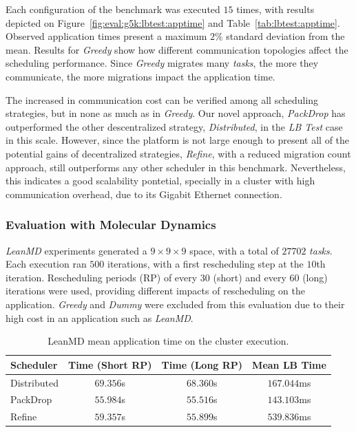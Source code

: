 
Each configuration of the benchmark was executed $15$ times, with results depicted on Figure~\ref{fig:eval:g5k:lbtest:apptime} and Table~\ref{tab:lbtest:apptime}.
Observed application times present a maximum $2\%$ standard deviation from the mean. 
Results for \textit{Greedy} show how different communication topologies affect the scheduling performance.
Since \textit{Greedy} migrates many \textit{tasks}, the more they communicate, the more migrations impact the application time.

The increased in communication cost can be verified among all scheduling strategies, but in none as much as in \textit{Greedy}.
Our novel approach, \textit{PackDrop} has outperformed the other descentralized strategy, \textit{Distributed}, in the \textit{LB Test} case in this scale.
However, since the platform is not large enough to present all of the potential gains of decentralized strategies, \textit{Refine}, with a reduced migration count approach, still outperforms any other scheduler in this benchmark.
Nevertheless, this indicates a good scalability pontetial, specially in a cluster with high communication overhead, due to its Gigabit Ethernet connection.

\subsubsection{Evaluation with Molecular Dynamics} \label{sec:cluster:md}

\textit{LeanMD} experiments generated a $9\times9\times9$ space, with a total of $27702$ \textit{tasks}.
Each execution ran $500$ iterations, with a first rescheduling step at the $10$th iteration. 
Rescheduling periods (RP) of every $30$ (short) and every $60$ (long) iterations were used, providing different impacts of rescheduling on the application.
\textit{Greedy} and \textit{Dummy} were excluded from this evaluation due to their high cost in an application such as \textit{LeanMD}. 

\begin{table}[!ht]
	\centering
	\caption{LeanMD mean application time on the cluster execution.}	
	\begin{tabular}{l|c c c}
	Scheduler & Time (Short RP) & Time (Long RP) & Mean LB Time \\ \hline
	Distributed & $69.356$s & $68.360$s & $167.044$ms \\ 
	PackDrop & $55.984$s & $55.516$s & $143.103$ms \\ 
	Refine & $59.357$s & $55.899$s & $539.836$ms \\ 
	\end{tabular}
	\label{tab:eval:g5k:leanmd:time} 
\end{table}

